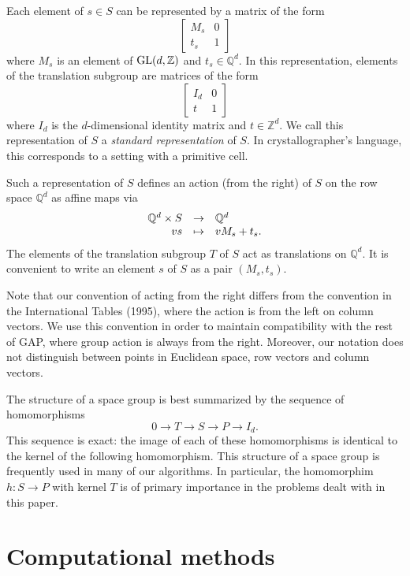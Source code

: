 \documentclass[12pt]{amsart}
\newcommand{\Q}{{\mathbb Q}}
\newcommand{\Z}{{\mathbb Z}}
\newcommand{\GL}{{\rm GL}}
\newcommand{\GAP}{{\sf GAP}}
\begin{document}
Each element of $s\in S$ can be represented by a matrix of the form
$$\left[\begin{array}{c|c}
  M_{s} & 0 \\
 \hline
  t_{s} & 1
\end{array}\right]$$ 
where $M_{s}$ is an element of $\GL(d,\Z)$ and $t_{s}\in \Q^d.$  In this 
representation, elements of the translation subgroup are matrices of the 
form
$$\left[\begin{array}{c|c}
   I_d & 0 \\
  \hline
   t & 1 
\end{array}\right]$$
where $I_d$ is the $d$-dimensional identity matrix and $t \in \Z^d$.
We call this representation of $S$ a {\em standard representation} of $S$.
In crystallographer's language, this corresponds to a setting with a
primitive cell.

Such a representation of $S$ defines an action (from the right)
of $S$ on the row space $\Q^d$ as affine maps via
$$\begin{array}{rcl}
        \Q^d\times S &   \to   & \Q^d\cr
            vs       & \mapsto & v M_s + t_s.\cr
\end{array}$$
The elements of the translation subgroup $T$ of $S$ act as translations on 
$\Q^d$. It is convenient to write an element $s$ of $S$ as a 
pair $(M_{s},t_{s}).$ 

Note that our convention of acting from the right differs from the
convention in the International Tables (1995), where the action is from 
the left on column vectors. We use this convention in order to maintain
compatibility with the rest of \GAP, where group action is always from the
right. Moreover, our notation does not distinguish between points
in Euclidean space, row vectors and column vectors.

The structure of a space group is best summarized by the
sequence of homomorphisms
$$
0 \to T \to S \to P \to I_d.
$$
This sequence is exact: the image of each of these homomorphisms 
is identical to the kernel of the following homomorphism. 
This structure of a space group is frequently used in many of 
our algorithms. In particular, the homomorphim $h:S\to P$ 
with kernel $T$ is of primary importance in the problems
dealt with in this paper.

\section{Computational methods}
\label{scomp}
\end{document}
